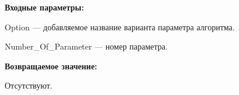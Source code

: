 \textbf{Входные параметры:}

Option --- добавляемое название варианта параметра алгоритма.
 
    Number\_Of\_Parameter --- номер параметра.

\textbf{Возвращаемое значение:}

Отсутствуют.
